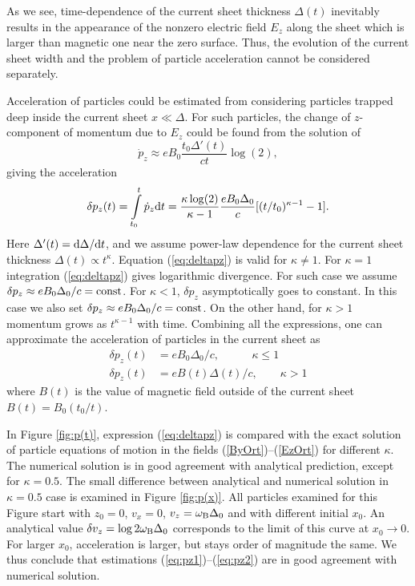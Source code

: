 \documentclass[useAMS,usenatbib]{mn2e}
\begin{document}
As we see, time-dependence of the current sheet thickness $\Delta(t)$ inevitably results in 
the appearance of the nonzero electric field $E_{z}$ along the sheet which is larger 
than magnetic one near the zero surface. Thus, the evolution of the current sheet
width and the problem of particle acceleration cannot be considered separately.

Acceleration of particles could be estimated from considering particles trapped deep inside 
the current sheet $x\ll \Delta$. For such particles, the change of $z$-component of momentum 
due to $E_z$ could be found from the solution of 
\begin{equation}
\dot p_z \approx e B_0 \frac{t_0 \Delta'(t)}{ct} \log(2),
\end{equation}
giving the acceleration
\begin{equation}
\delta p_z(t) = \int\limits_{t_0}^{t} \dot p_z {\rm d}t = \frac{\kappa \log(2)}{\kappa - 1} \frac{e B_0 \Delta_0}{c}[(t/t_0)^{\kappa -1} - 1].  
\label{eq:deltapz}
\end{equation}
Here $\Delta'(t) = {\rm d}\Delta/{\rm d} t$, and we assume power-law dependence 
for the current sheet thickness 
$\Delta(t) \propto t^\kappa$. Equation (\ref{eq:deltapz}) is valid for 
$\kappa \ne 1$. For $\kappa = 1$ integration (\ref{eq:deltapz}) gives 
logarithmic divergence. For such case we assume 
$\delta p_z \approx e B_0 \Delta_0/c = {\rm const}$. 
For $\kappa < 1$, $\delta p_z$ asymptotically goes to constant. In this 
case we also set $\delta p_z \approx e B_0 \Delta_0/c = {\rm const}$. 
On the other hand, for $\kappa > 1$ momentum grows as $t^{\kappa - 1}$
with time. Combining all the expressions, one can approximate the 
acceleration of particles in the current sheet as
\begin{align}
\delta p_z(t)  &= e B_0 \Delta_0/c, ~~~~\qquad \kappa \le 1 \label{eq:pz1}\\
\delta p_z(t)  &= e B(t) \Delta(t)/c, \qquad \kappa > 1 \label{eq:pz2}
\end{align}
where $B(t)$ is the value of magnetic field outside of the current sheet $B(t) = B_0 (t_0/t)$.

In Figure \ref{fig:p(t)}, expression (\ref{eq:deltapz}) is compared with the exact 
solution of particle equations of motion in the fields (\ref{ByOrt})--(\ref{EzOrt})
for different $\kappa$. The numerical solution is in good agreement with analytical 
prediction, except for $\kappa = 0.5$. The small difference between analytical and 
numerical solution in $\kappa = 0.5$ case is examined in Figure \ref{fig:p(x)}. 
All particles examined for this Figure start with $ z_0 = 0$, $v_x = 0$, 
$v_z = \omega_{\rm B}\Delta_0$ and with different initial $x_0$. An analytical value 
$\delta v_z = \log 2 \omega_{\rm B}\Delta_0$ corresponds to the limit of this curve 
at $x_0 \rightarrow 0$. For larger $x_0$, acceleration is larger, but stays order of
magnitude the same. We thus conclude that estimations (\ref{eq:pz1})--(\ref{eq:pz2})
are in good agreement with numerical solution.
\end{document}

